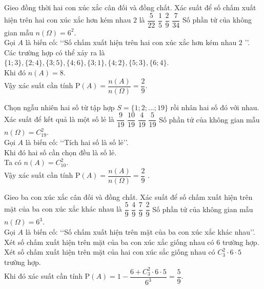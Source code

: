 \begin{ex}%
	Gieo đồng thời hai con xúc xắc cân đối và đồng chất. Xác suất để số chấm xuất hiện trên hai con xúc xắc hơn kém nhau $2$ là
	\choice
	{$\dfrac{5}{22}$}
	{$\dfrac{1}{5}$}
	{\True $\dfrac{2}{9}$}
	{$\dfrac{7}{34}$}
	\loigiai
	{
		Số phần tử của không gian mẫu $n(\Omega)=6^2$.\\
		Gọi  $A$ là biến cố: \lq\lq  Số chấm xuất hiện trên hai con xúc xắc hơn kém nhau $2$ \rq\rq.\\
		Các trường hợp có thể xảy ra là $\{1 ; 3\},\{2 ; 4\},\{3 ; 5\},\{4 ; 6\},\{3 ; 1\},\{4 ; 2\},\{5 ; 3\},\{6 ; 4\}$.\\
		Khi đó $n(A)=8$.\\
		Vậy xác suất cần tính $ \mathrm{P}(A)=\dfrac{n(A)}{n(\Omega)}=\dfrac{2}{9}$.		
	}	
\end{ex}
\begin{ex}%
	Chọn ngẫu nhiên hai số từ tập hợp $S=\{1 ; 2 ; \ldots ; 19\}$ rồi nhân hai số đó với nhau. Xác suất để kết quả là một số lẻ là
	\choice
	{$\dfrac{9}{19}$}
	{$\dfrac{10}{19}$}
	{$\dfrac{4}{19}$}
	{\True $\dfrac{5}{19}$}
	\loigiai
	{
		Số phần tử của không gian mẫu $n(\Omega)=C_{19}^{2}$.\\
		Gọi $A$ là biến cố: \lq\lq  Tích hai số là số lẻ\rq\rq.\\
		Khi đó hai số cần chọn đều là số lẻ.\\
		Ta có $n(A)=C_{10}^{2}$.\\
		Vậy xác suất cần tính $ \mathrm{P}(A)=\dfrac{n(A)}{n(\Omega)}=\dfrac{2}{9}$ 	.	
	}	
\end{ex}
\begin{ex}%
	Gieo ba con xúc xắc cân đối và đồng chất. Xác suất để số chấm xuất hiện trên mặt của ba con xúc xắc khác nhau là
	\choice
	{\True $\dfrac{5}{9}$}
	{$\dfrac{4}{9}$}
	{$\dfrac{7}{9}$}
	{$\dfrac{2}{9}$}
	\loigiai
	{
		Số phần tử của không gian mẫu $n(\Omega)=6^3$.\\
		Gọi  $A$ là biến cố: \lq\lq  Số chấm xuất hiện trên mặt của ba con xúc xắc khác nhau\rq\rq.\\
		Xét số chấm xuất hiện trên mặt của ba con xúc xắc giống nhau có $6$ trường hợp.\\
		Xét số chấm xuất hiện trên mặt của hai con xúc sắc giống nhau có $C_{3}^{2}\cdot 6\cdot 5$ trường hợp.\\
		Khi đó xác suất cần tính $ \mathrm{P}(A)=1-\dfrac{6+C_{3}^{2} \cdot 6 \cdot 5}{6^{3}}=\dfrac{5}{9}$. 		
	}	
\end{ex}
